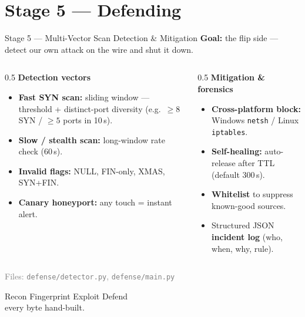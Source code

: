\documentclass[10pt,aspectratio=169]{beamer}
\begin{document}
\section{Stage 5 --- Defending}
\begin{frame}{Stage 5 --- Multi-Vector Scan Detection \& Mitigation}
  \textbf{Goal:} the flip side --- detect our own attack on the wire and shut it down.
  \begin{columns}[T]
    \begin{column}{0.5\textwidth}
      \textbf{Detection vectors}
      \begin{itemize}
        \item \textbf{Fast SYN scan:} sliding window --- threshold + distinct-port
              diversity (e.g.\ $\ge 8$ SYN / $\ge 5$ ports in 10\,s).
        \item \textbf{Slow / stealth scan:} long-window rate check (60\,s).
        \item \textbf{Invalid flags:} NULL, FIN-only, XMAS, SYN+FIN.
        \item \textbf{Canary honeyport:} any touch = instant alert.
      \end{itemize}
    \end{column}
    \begin{column}{0.5\textwidth}
      \textbf{Mitigation \& forensics}
      \begin{itemize}
        \item \textbf{Cross-platform block:} Windows \texttt{netsh} /
              Linux \texttt{iptables}.
        \item \textbf{Self-healing:} auto-release after TTL (default 300\,s).
        \item \textbf{Whitelist} to suppress known-good sources.
        \item Structured JSON \textbf{incident log} (who, when, why, rule).
      \end{itemize}
    \end{column}
  \end{columns}
  \vspace{0.3em}
  \footnotesize\textcolor{gray}{Files: \texttt{defense/detector.py}, \texttt{defense/main.py}}
\end{frame}

\begin{frame}[standout]
  Recon \textrightarrow{} Fingerprint \textrightarrow{} Exploit \textrightarrow{} Defend \\[0.5em]
  \large every byte hand-built.
\end{frame}
\end{document}

